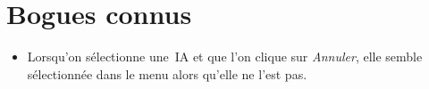 \section{Bogues connus}
\begin{itemize}

	\item Lorsqu'on sélectionne une~IA et que l'on clique sur \textit{Annuler}, 
            elle semble sélectionnée dans le menu alors qu'elle ne l'est pas.
    
\end{itemize}